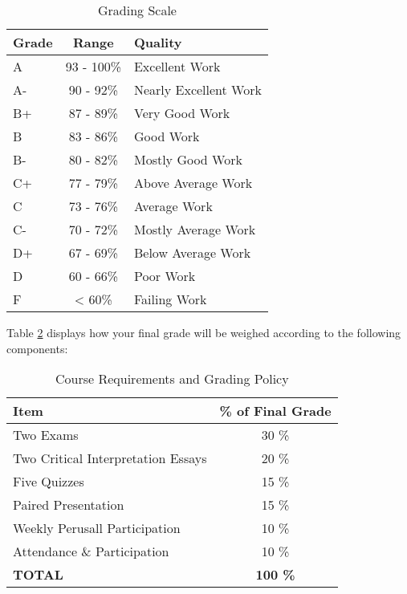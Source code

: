 \documentclass[11pt,]{article}
\begin{document}
\begin{table}[!h]

\caption{\label{tab:grade_scale}Grading Scale}
\centering
\fontsize{10}{12}\selectfont
\begin{tabular}[t]{l|c|l}
\hline
\textbf{Grade} & \textbf{Range} & \textbf{Quality}\\
\hline
A & 93 - 100\% & Excellent Work\\
\hline
A- & 90 - 92\% & Nearly Excellent Work\\
\hline
B+ & 87 - 89\% & Very Good Work\\
\hline
B & 83 - 86\% & Good Work\\
\hline
B- & 80 - 82\% & Mostly Good Work\\
\hline
C+ & 77 - 79\% & Above Average Work\\
\hline
C & 73 - 76\% & Average Work\\
\hline
C- & 70 - 72\% & Mostly Average Work\\
\hline
D+ & 67 - 69\% & Below Average Work\\
\hline
D & 60 - 66\% & Poor Work\\
\hline
F & < 60\% & Failing Work\\
\hline
\end{tabular}
\end{table}

Table \ref{tab:weight_table} displays how your final grade will be
weighed according to the following components:

\renewcommand{\arraystretch}{1.5}

\begin{table}[!h]

\caption{\label{tab:weight_table}Course Requirements and Grading Policy}
\centering
\fontsize{10}{12}\selectfont
\begin{tabular}[t]{lc}
\toprule
\textbf{Item} & \textbf{\% of Final Grade}\\
\midrule
Two Exams & 30 \%\\
Two Critical Interpretation Essays & 20 \%\\
Five Quizzes & 15 \%\\
Paired Presentation & 15 \%\\
Weekly Perusall Participation & 10 \%\\
Attendance \& Participation & 10 \%\\
\textbf{TOTAL} & \textbf{100 \%}\\
\midrule
\bottomrule
\end{tabular}
\end{table}
\end{document}
